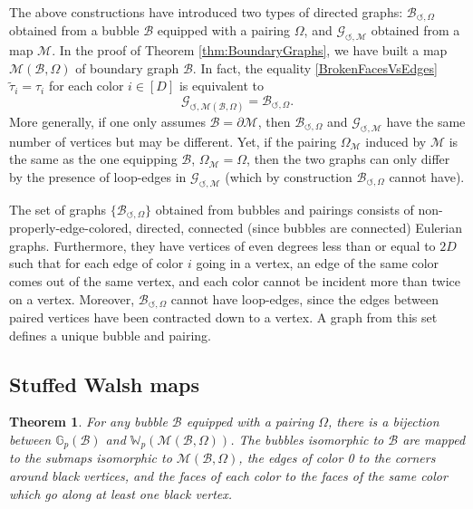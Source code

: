 \documentclass[aps,prd,10pt,notitlepage,nofootinbib,superscriptaddress,showkeys,showpacs]{revtex4-1}
\newtheorem{theorem}{Theorem}
\begin{document}
The above constructions have introduced two types of directed graphs: ${\mathcal{B}}_{\circlearrowleft, \Omega}$ obtained from a bubble ${\mathcal{B}}$ equipped with a pairing $\Omega$, and ${\mathcal{G}}_{\circlearrowleft, {\mathcal{M}}}$ obtained from a map ${\mathcal{M}}$. In the proof of Theorem \ref{thm:BoundaryGraphs}, we have built a map ${\mathcal{M}}({\mathcal{B}}, \Omega)$ of boundary graph ${\mathcal{B}}$. In fact, the equality \eqref{BrokenFacesVsEdges} $\tilde{\tau}_i = \tau_i$ for each color $i\in [D]$ is equivalent to 
\begin{equation}
{\mathcal{G}}_{\circlearrowleft, {\mathcal{M}}({\mathcal{B}}, \Omega)} = {\mathcal{B}}_{\circlearrowleft, \Omega}.
\end{equation}
More generally, if one only assumes ${\mathcal{B}} = \partial {\mathcal{M}}$, then ${\mathcal{B}}_{\circlearrowleft, \Omega}$ and ${\mathcal{G}}_{\circlearrowleft, {\mathcal{M}}}$ have the same number of vertices but may be different. Yet, if the pairing $\Omega_{\mathcal{M}}$ induced by ${\mathcal{M}}$ is the same as the one equipping ${\mathcal{B}}$, $\Omega_{\mathcal{M}} = \Omega$, then the two graphs can only differ by the presence of loop-edges in ${\mathcal{G}}_{\circlearrowleft, {\mathcal{M}}}$ (which by construction ${\mathcal{B}}_{\circlearrowleft, \Omega}$ cannot have).

The set of graphs $\{{\mathcal{B}}_{\circlearrowleft, \Omega}\}$ obtained from bubbles and pairings consists of non-properly-edge-colored, directed, connected (since bubbles are connected) Eulerian graphs. Furthermore, they have vertices of even degrees less than or equal to $2D$ such that for each edge of color $i$ going in a vertex, an edge of the same color comes out of the same vertex, and each color cannot be incident more than twice on a vertex. Moreover, ${\mathcal{B}}_{\circlearrowleft, \Omega}$ cannot have loop-edges, since the edges between paired vertices have been contracted down to a vertex. A graph from this set defines a unique bubble and pairing. 

\subsection{Stuffed Walsh maps}

\begin{theorem}
For any bubble ${\mathcal{B}}$ equipped with a pairing $\Omega$, there is a bijection between ${\mathbb{G}}_p({\mathcal{B}})$ and ${\mathbb{W}}_p({\mathcal{M}}({\mathcal{B}}, \Omega))$. The bubbles isomorphic to ${\mathcal{B}}$ are mapped to the submaps isomorphic to ${\mathcal{M}}({\mathcal{B}}, \Omega)$, the edges of color 0 to the corners around black vertices, and the faces of each color to the faces of the same color which go along at least one black vertex.
\end{theorem}
\end{document}
